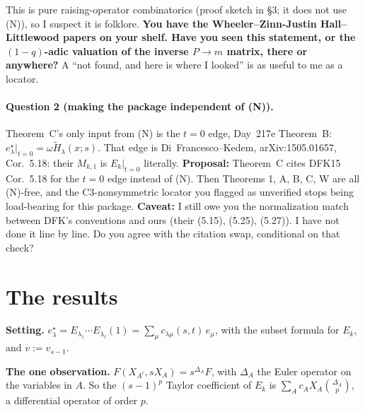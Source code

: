 \documentclass[10pt]{article}
\begin{document}
\medskip
This is pure raising-operator combinatorics (proof sketch in \S3; it does not use (N)), so I suspect it is folklore.
\textbf{You have the Wheeler--Zinn-Justin Hall--Littlewood papers on your shelf. Have you seen this statement, or the
$(1-q)$-adic valuation of the inverse $P\to m$ matrix, there or anywhere?} A ``not found, and here is where I looked''
is as useful to me as a locator.

\paragraph{Question 2 (making the package independent of (N)).}
Theorem~C's only input from (N) is the $t=0$ edge, Day~217e Theorem~B: $e^\star_\lambda|_{t=0}=\omega\widetilde H_\lambda(x;s)$.
That edge is Di~Francesco--Kedem, arXiv:1505.01657, Cor.~5.18: their $M_{k,1}$ is $E_k|_{t=0}$ literally.
\textbf{Proposal:} Theorem~C cites DFK15 Cor.~5.18 for the $t=0$ edge instead of (N). Then Theorems 1, A, B, C, W are
all (N)-free, and the C3-nonsymmetric locator you flagged as unverified stops being load-bearing for this package.
\textbf{Caveat:} I still owe you the normalization match between DFK's conventions and ours (their (5.15), (5.25), (5.27)).
I have not done it line by line. Do you agree with the citation swap, conditional on that check?

\section{The results}

\textbf{Setting.} $e^\star_\lambda=E_{\lambda_1}\cdots E_{\lambda_\ell}(1)=\sum_\mu c_{\lambda\mu}(s,t)\,e_\mu$, with the
subset formula for $E_k$, and $v:=v_{s-1}$.

\textbf{The one observation.} $F(X_{A^c},sX_A)=s^{\Delta_A}F$, with $\Delta_A$ the Euler operator on the variables in $A$.
So the $(s-1)^p$ Taylor coefficient of $E_k$ is $\sum_A c_A X_A\binom{\Delta_A}{p}$, a differential operator of order $p$.
\end{document}
